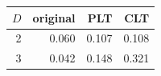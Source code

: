 \begin{tabular}{rrrr}\toprule
$D$ & original & PLT & CLT\\\midrule
2 & 0.060 & 0.107 & 0.108\\
3 & 0.042 & 0.148 & 0.321\\
\bottomrule\end{tabular}
